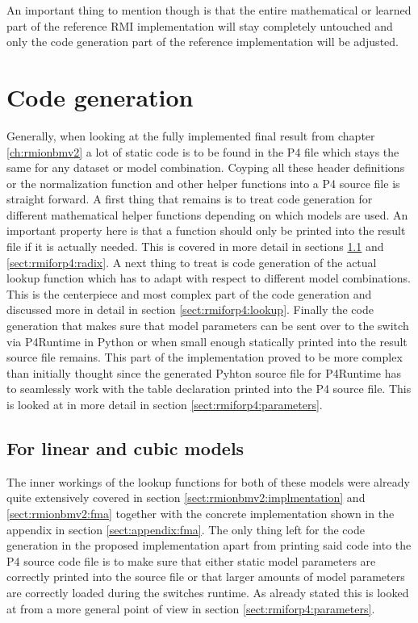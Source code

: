 An important thing to mention though is that the entire mathematical or learned part of the reference RMI implementation will stay completely untouched and only the code generation part of the reference implementation will be adjusted.

\section{Code generation}
Generally, when looking at the fully implemented final result from chapter \ref{ch:rmionbmv2} a lot of static code is to be found in the P4 file which stays the same for any dataset or model combination. Coyping all these header definitions or the normalization function and other helper functions into a P4 source file is straight forward. A first thing that remains is to treat code generation for different mathematical helper functions depending on which models are used. An important property here is that a function should only be printed into the result file if it is actually needed. This is covered in more detail in sections \ref{sect:rmiforp4:linear_cubic} and \ref{sect:rmiforp4:radix}. A next thing to treat is code generation of the actual lookup function which has to adapt with respect to different model combinations. This is the centerpiece and most complex part of the code generation and discussed more in detail in section \ref{sect:rmiforp4:lookup}. Finally the code generation that makes sure that model parameters can be sent over to the switch via P4Runtime in Python or when small enough statically printed into the result source file remains. This part of the implementation proved to be more complex than initially thought since the generated Pyhton source file for P4Runtime has to seamlessly work with the table declaration printed into the P4 source file. This is looked at in more detail in section \ref{sect:rmiforp4:parameters}.

\subsection{For linear and cubic models}
\label{sect:rmiforp4:linear_cubic}
The inner workings of the lookup functions for both of these models were already quite extensively covered in section \ref{sect:rmionbmv2:implmentation} and \ref{sect:rmionbmv2:fma} together with the concrete implementation shown in the appendix in section \ref{sect:appendix:fma}. The only thing left for the code generation in the proposed implementation apart from printing said code into the P4 source code file is to make sure that either static model parameters are correctly printed into the source file or that larger amounts of model parameters are correctly loaded during the switches runtime. As already stated this is looked at from a more general point of view in section \ref{sect:rmiforp4:parameters}.

